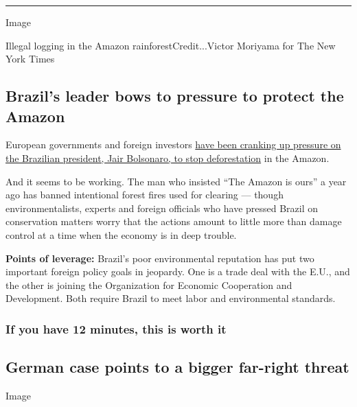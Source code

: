 \begin{center}\rule{0.5\linewidth}{\linethickness}\end{center}

Image

Illegal logging in the Amazon rainforestCredit...Victor Moriyama for The
New York Times

\hypertarget{brazils-leader-bows-to-pressure-to-protect-the-amazon}{%
\subsection{Brazil's leader bows to pressure to protect the
Amazon}\label{brazils-leader-bows-to-pressure-to-protect-the-amazon}}

European governments and foreign investors
\href{https://www.nytimes3xbfgragh.onion/2020/08/01/world/americas/Brazil-amazon-deforestation-bolsonaro.html?referringSource=articleShare}{have
been cranking up pressure on the Brazilian president, Jair Bolsonaro, to
stop deforestation} in the Amazon.

And it seems to be working. The man who insisted ``The Amazon is ours''
a year ago has banned intentional forest fires used for clearing ---
though environmentalists, experts and foreign officials who have pressed
Brazil on conservation matters worry that the actions amount to little
more than damage control at a time when the economy is in deep trouble.

\textbf{Points of leverage:} Brazil's poor environmental reputation has
put two important foreign policy goals in jeopardy. One is a trade deal
with the E.U., and the other is joining the Organization for Economic
Cooperation and Development. Both require Brazil to meet labor and
environmental standards.

\hypertarget{if-you-have-12-minutes-this-is-worth-it}{%
\subsubsection{If you have 12 minutes, this is worth
it}\label{if-you-have-12-minutes-this-is-worth-it}}

\hypertarget{german-case-points-to-a-bigger-far-right-threat}{%
\subsection{German case points to a bigger far-right
threat}\label{german-case-points-to-a-bigger-far-right-threat}}

Image

